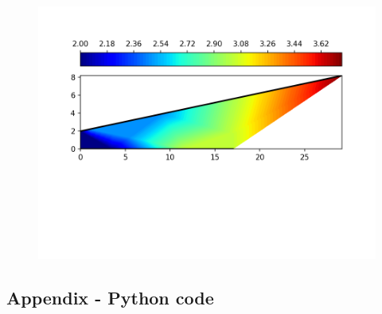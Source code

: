 \documentclass[conf]{new-aiaa}
\begin{document}
\begin{figure}[!h]
	\centering
	\includegraphics[scale=0.8]{results/Contour.png}
\end{figure}

\pagebreak

\begin{appendices}
    \section{Appendix - Python code}\label{appendixA}
    
\end{appendices}
\end{document}
